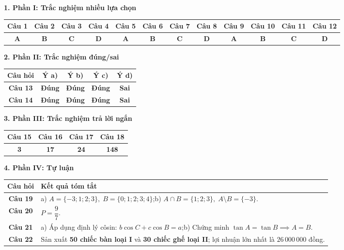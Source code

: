 \documentclass[12pt,a4paper]{article}
\begin{document}
\vspace{0.2cm}
\textbf{1. Phần I: Trắc nghiệm nhiều lựa chọn}
\begin{center}
{\setlength{\tabcolsep}{2.5pt}\small
\begin{tabular}{|c|c|c|c|c|c|c|c|c|c|c|c|}
\hline
\textbf{Câu 1} & \textbf{Câu 2} & \textbf{Câu 3} & \textbf{Câu 4} & \textbf{Câu 5} & \textbf{Câu 6} & \textbf{Câu 7} & \textbf{Câu 8} & \textbf{Câu 9} & \textbf{Câu 10} & \textbf{Câu 11} & \textbf{Câu 12} \\
\hline
\textbf{A} & \textbf{B} & \textbf{C} & \textbf{D} & \textbf{A} & \textbf{B} & \textbf{C} & \textbf{D} & \textbf{A} & \textbf{B} & \textbf{C} & \textbf{D} \\
\hline
\end{tabular}}
\end{center}

\vspace{0.2cm}
\textbf{2. Phần II: Trắc nghiệm đúng/sai}
\begin{center}
\begin{tabular}{|c|c|c|c|c|}
\hline
\textbf{Câu hỏi} & \textbf{Ý a)} & \textbf{Ý b)} & \textbf{Ý c)} & \textbf{Ý d)} \\
\hline
\textbf{Câu 13} & \textbf{Đúng} & \textbf{Đúng} & \textbf{Đúng} & \textbf{Sai} \\
\hline
\textbf{Câu 14} & \textbf{Đúng} & \textbf{Đúng} & \textbf{Đúng} & \textbf{Sai} \\
\hline
\end{tabular}
\end{center}

\vspace{0.2cm}
\textbf{3. Phần III: Trắc nghiệm trả lời ngắn}
\begin{center}
\begin{tabular}{|c|c|c|c|}
\hline
\textbf{Câu 15} & \textbf{Câu 16} & \textbf{Câu 17} & \textbf{Câu 18} \\
\hline
\textbf{3} & \textbf{17} & \textbf{24} & \textbf{148} \\
\hline
\end{tabular}
\end{center}

\vspace{0.2cm}
\textbf{4. Phần IV: Tự luận}
\begin{center}
\begin{tabularx}{\linewidth}{|c|>{\raggedright\arraybackslash}X|}
\hline
\textbf{Câu hỏi} & \textbf{Kết quả tóm tắt} \\
\hline
\textbf{Câu 19} & a) $A = \{-3; 1; 2; 3\},\; B = \{0; 1; 2; 3; 4\}$;\quad b) $A \cap B = \{1; 2; 3\},\; A \setminus B = \{-3\}$. \\
\hline
\textbf{Câu 20} & $P = \dfrac{9}{7}$. \\
\hline
\textbf{Câu 21} & a) Áp dụng định lý côsin: $b \cos C + c \cos B = a$;\quad b) Chứng minh $\tan A = \tan B \implies A = B$. \\
\hline
\textbf{Câu 22} & Sản xuất \textbf{50 chiếc bàn loại I} và \textbf{30 chiếc ghế loại II}; lợi nhuận lớn nhất là $26\,000\,000$ đồng. \\
\hline
\end{tabularx}
\end{center}
\end{document}
